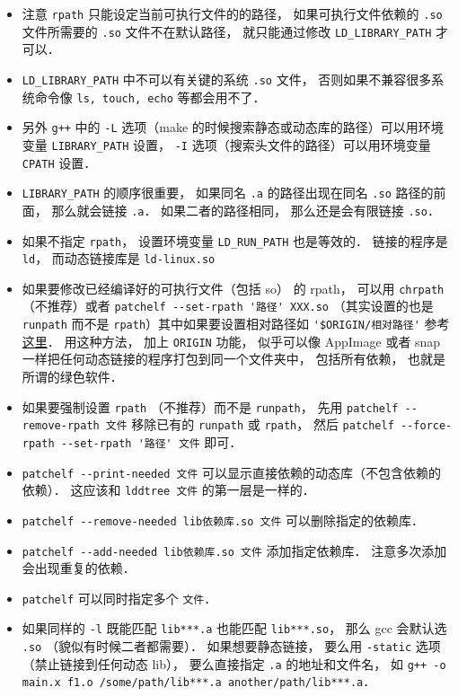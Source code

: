 \begin{itemize}
\item 注意 \verb|rpath| 只能设定当前可执行文件的的路径， 如果可执行文件依赖的 \verb|.so| 文件所需要的 \verb|.so| 文件不在默认路径， 就只能通过修改 \verb`LD_LIBRARY_PATH` 才可以．
\item \verb|LD_LIBRARY_PATH| 中不可以有关键的系统 \verb|.so| 文件， 否则如果不兼容很多系统命令像 \verb|ls, touch, echo| 等都会用不了．
\item 另外 \verb|g++| 中的 \verb|-L| 选项（make 的时候搜索静态或动态库的路径）可以用环境变量 \verb|LIBRARY_PATH| 设置， \verb|-I| 选项（搜索头文件的路径）可以用环境变量 \verb|CPATH| 设置．
\item \verb|LIBRARY_PATH| 的顺序很重要， 如果同名 \verb|.a| 的路径出现在同名 \verb|.so| 路径的前面， 那么就会链接 \verb|.a|． 如果二者的路径相同， 那么还是会有限链接 \verb|.so|．
\item 如果不指定 \verb|rpath|， 设置环境变量 \verb|LD_RUN_PATH| 也是等效的． 链接的程序是 \verb|ld|， 而动态链接库是 \verb|ld-linux.so|
\item 如果要修改已经编译好的可执行文件（包括 so） 的 rpath， 可以用 \verb|chrpath| （不推荐）或者 \verb|patchelf --set-rpath '路径' XXX.so| （其实设置的也是 \verb|runpath| 而不是 \verb|rpath|）其中如果要设置相对路径如 \verb|'$ORIGIN/相对路径'| 参考\href{https://stackoverflow.com/questions/13769141/can-i-change-rpath-in-an-already-compiled-binary}{这里}． 用这种方法， 加上 \verb|ORIGIN| 功能， 似乎可以像 AppImage 或者 snap 一样把任何动态链接的程序打包到同一个文件夹中， 包括所有依赖， 也就是所谓的绿色软件．
\item 如果要强制设置 \verb|rpath| （不推荐）而不是 \verb|runpath|， 先用 \verb|patchelf --remove-rpath 文件| 移除已有的 \verb|runpath| 或 \verb|rpath|， 然后 \verb|patchelf --force-rpath --set-rpath '路径' 文件| 即可．
\item \verb|patchelf --print-needed 文件| 可以显示直接依赖的动态库（不包含依赖的依赖）． 这应该和 \verb|lddtree 文件| 的第一层是一样的．
\item \verb|patchelf --remove-needed lib依赖库.so 文件| 可以删除指定的依赖库．
\item \verb|patchelf --add-needed lib依赖库.so 文件| 添加指定依赖库． 注意多次添加会出现重复的依赖．
\item \verb|patchelf| 可以同时指定多个 \verb|文件|．
\item 如果同样的 \verb`-l` 既能匹配 \verb`lib***.a` 也能匹配 \verb`lib***.so`， 那么 gcc 会默认选 \verb`.so` （貌似有时候二者都需要）． 如果想要静态链接， 要么用 \verb`-static` 选项（禁止链接到任何动态 lib）， 要么直接指定 \verb`.a` 的地址和文件名， 如 \verb`g++ -o main.x f1.o /some/path/lib***.a another/path/lib***.a`．

\end{itemize}
